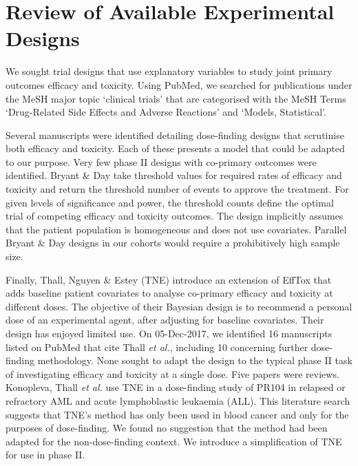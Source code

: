 \documentclass[graybox]{svmult}
\begin{document}
\section{Review of Available Experimental Designs}
We sought trial designs that use explanatory variables to study joint primary outcomes efficacy and toxicity.
Using PubMed, we searched for publications under the MeSH major topic `clinical trials' that are categorised with the MeSH Terms `Drug-Related Side Effects and Adverse Reactions' and `Models, Statistical'.

Several manuscripts were identified detailing dose-finding designs that scrutinise both efficacy and toxicity\cite{Braun2002, Thall2004, Zhang2006}.
Each of these presents a model that could be adapted to our purpose.
Very few phase II designs with co-primary outcomes were identified.
Bryant \& Day\cite{Bryant1995} take threshold values for required rates of efficacy and toxicity and return the threshold number of events to approve the treatment.
For given levels of significance and power, the threshold counts define the optimal trial of competing efficacy and toxicity outcomes.
The design implicitly assumes that the patient population is homogeneous and does not use covariates.
Parallel Bryant \& Day designs in our cohorts would require a prohibitively high sample size.

Finally, Thall, Nguyen \& Estey (TNE)\cite{Thall2008} introduce an extension of EffTox\cite{Thall2004} that adds baseline patient covariates to analyse co-primary efficacy and toxicity at different doses.
The objective of their Bayesian design is to recommend a personal dose of an experimental agent, after adjusting for baseline covariates.
Their design has enjoyed limited use.
On 05-Dec-2017, we identified 16 manuscripts listed on PubMed that cite Thall \textit{et al.}\cite{Thall2008}, including 10 concerning further dose-finding methodology.
None sought to adapt the design to the typical phase II task of investigating efficacy and toxicity at a single dose.
Five papers were reviews.
Konopleva, Thall \textit{et al.}\cite{Konopleva2015} use TNE in a dose-finding study of PR104 in relapsed or refractory AML and acute lymphoblastic leukaemia (ALL).
This literature search suggests that TNE's method has only been used in blood cancer and only for the purposes of dose-finding.
We found no suggestion that the method had been adapted for the non-dose-finding context.
We introduce a simplification of TNE for use in phase II.
\end{document}
